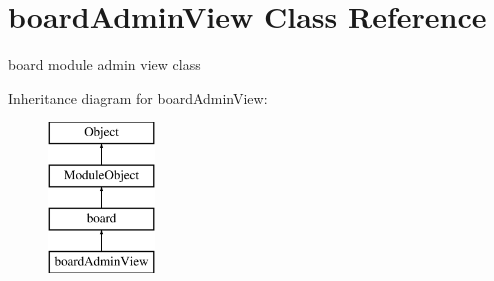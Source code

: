 \hypertarget{classboardAdminView}{\section{board\+Admin\+View Class Reference}
\label{classboardAdminView}
}


board module admin view class  


Inheritance diagram for board\+Admin\+View\+:\begin{figure}[H]
\begin{center}
\leavevmode
\includegraphics[height=4.000000cm]{classboardAdminView}
\end{center}
\end{figure}
